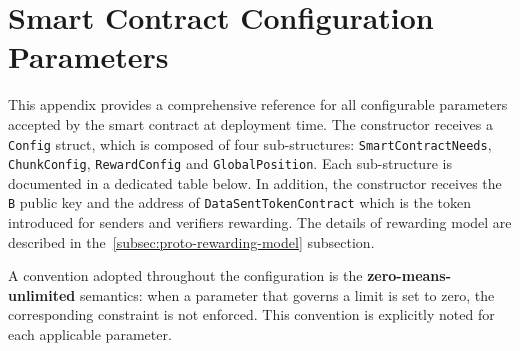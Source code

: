 \chapter{Smart Contract Configuration Parameters}\label{ch:appendix-a-parameters}
This appendix provides a comprehensive reference for all configurable parameters accepted by the smart contract at deployment time.
The constructor receives a
    \texttt{Config} struct, which is composed of four sub-structures:
        \texttt{SmartContractNeeds},
        \texttt{ChunkConfig},
        \texttt{RewardConfig} and \texttt{GlobalPosition}.
Each sub-structure is documented in a dedicated table below.
In addition, the constructor receives the \texttt{B} public key and the address of \texttt{DataSentTokenContract} which is the token introduced for senders and verifiers rewarding.
The details of rewarding model are described in the~\ref{subsec:proto-rewarding-model} subsection.

A convention adopted throughout the configuration is the \textbf{zero-means-unlimited} semantics: when a parameter that governs a limit is set to zero, the corresponding constraint is not enforced.
This convention is explicitly noted for each applicable parameter.


